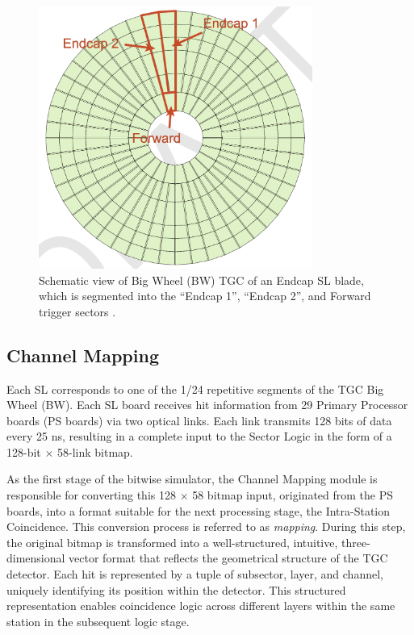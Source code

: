 \begin{figure}[htbp]
  \centering
  \includegraphics[width=0.8\textwidth]{figs/chapter5/endcap_and_forward_region.png}
  \caption{Schematic view of Big Wheel (BW) TGC of an Endcap SL blade, which is segmented into the ``Endcap 1'', ``Endcap 2'', and Forward trigger sectors \cite{EndcapSLPDR}.}
  \label{fig:endcapAndForward}
\end{figure}

\subsection{Channel Mapping} \label{subsec:ChannelMapping}
Each SL corresponds to one of the 1/24 repetitive segments of the TGC Big Wheel (BW). Each SL board receives hit information from 29 Primary Processor boards (PS boards) via two optical links. Each link transmits 128 bits of data every 25 ns, resulting in a complete input to the Sector Logic in the form of a 128-bit $\times$ 58-link bitmap.

As the first stage of the bitwise simulator, the Channel Mapping module is responsible for converting this 128 $\times$ 58 bitmap input, originated from the PS boards, into a format suitable for the next processing stage, the Intra-Station Coincidence. This conversion process is referred to as \textit{mapping}. During this step, the original bitmap is transformed into a well-structured, intuitive, three-dimensional vector format that reflects the geometrical structure of the TGC detector. Each hit is represented by a tuple of subsector, layer, and channel, uniquely identifying its position within the detector. This structured representation enables coincidence logic across different layers within the same station in the subsequent logic stage.
